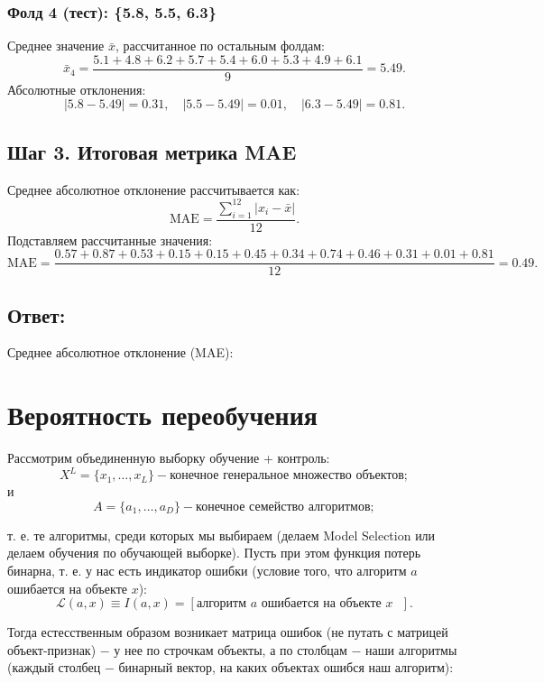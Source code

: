 \subsubsection*{Фолд 4 (тест): \{5.8, 5.5, 6.3\}}
Среднее значение \(\bar{x}\), рассчитанное по остальным фолдам:
\[
\bar{x}_4 = \frac{5.1 + 4.8 + 6.2 + 5.7 + 5.4 + 6.0 + 5.3 + 4.9 + 6.1}{9} = 5.49.
\]
Абсолютные отклонения:
\[
|5.8 - 5.49| = 0.31, \quad |5.5 - 5.49| = 0.01, \quad |6.3 - 5.49| = 0.81.
\]

\subsection*{Шаг 3. Итоговая метрика MAE}
Среднее абсолютное отклонение рассчитывается как:
\[
\text{MAE} = \frac{\sum_{i=1}^{12} |x_i - \bar{x}|}{12}.
\]
Подставляем рассчитанные значения:
\[
\text{MAE} = \frac{0.57 + 0.87 + 0.53 + 0.15 + 0.15 + 0.45 + 0.34 + 0.74 + 0.46 + 0.31 + 0.01 + 0.81}{12} = 0.49.
\]

\subsection*{Ответ:}
Среднее абсолютное отклонение (MAE): 

\section{Вероятность переобучения}

Рассмотрим объединенную выборку обучение + контроль:
\begin{equation*}
    X^L=\{ x_1, \dots , x_L \} - \text{конечное} \textit{ генеральное множество } \text{объектов};
\end{equation*}
и
\begin{equation*}
    A=\{ a_1, \dots , a_D \} - \text{конечное} \textit{ семейство алгоритмов};
\end{equation*}

т. е. те алгоритмы, среди которых мы выбираем (делаем Model \newline Selection или делаем обучения по обучающей выборке). Пусть при этом функция потерь бинарна, т. е. у нас есть индикатор ошибки (условие того, что алгоритм $a$ ошибается на объекте $x$):
\begin{equation*}
    \mathcal{L} ( a, x ) \equiv I ( a, x ) = [ \text{алгоритм $a$ ошибается на объекте $x$ } ].
\end{equation*}

Тогда естесственным образом возникает матрица ошибок (не путать с матрицей объект-признак) $-$ у нее по строчкам объекты, а по столбцам $-$ наши алгоритмы (каждый столбец $-$ бинарный вектор, на каких объектах ошибся наш алгоритм):

